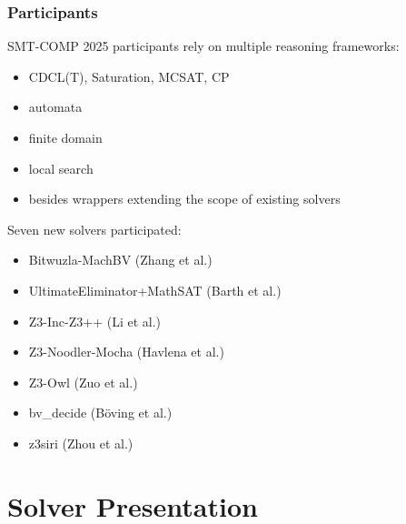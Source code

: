 \documentclass[table]{beamer}
\begin{document}
\begin{frame}
  \frametitle{Participants}

  SMT-COMP 2025 participants rely on multiple reasoning frameworks:
  \begin{itemize}
  \item CDCL(T), Saturation, MCSAT, CP
  \item automata
  \item finite domain
  \item local search
  \item besides wrappers extending the scope of existing solvers
  \end{itemize}

  \bigskip
  Seven new solvers participated:
  \begin{itemize}
\item Bitwuzla-MachBV {\footnotesize (Zhang et al.)}
\item UltimateEliminator+MathSAT {\footnotesize (Barth et al.)}
\item Z3-Inc-Z3++ {\footnotesize (Li et al.)}
\item Z3-Noodler-Mocha {\footnotesize (Havlena et al.)}
\item Z3-Owl {\footnotesize (Zuo et al.)}
\item bv\_decide {\footnotesize (Böving et al.)}
\item z3siri {\footnotesize (Zhou et al.)}
\end{itemize}

\end{frame}

\section{Solver Presentation}

\newcommand{\myincludepdf}[1]{
\begin{frame}
  \vspace*{-1pt}%
  \noindent\makebox[\textwidth]{%
    \texttt{[image: \#1]}}
\end{frame}
}
\end{document}
